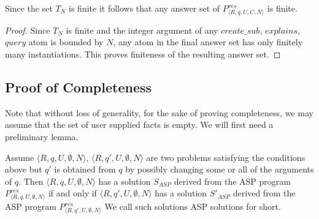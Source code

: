 \begin{lemma}
Since the set $T_{N}$ is finite it follows that any answer set of $P_{\langle
  R,q,U,C,N \rangle}^{res}$ is finite.
\end{lemma}

\begin{proof}
Since $T_{N}$ is finite and the integer argument of any $create\_sub$, $explains$, $query$ 
atom is bounded by $N$, any atom in the final answer set has only finitely
many instantiations. This proves finiteness of the resulting answer set.
\end{proof}

\subsection{Proof of Completeness}\label{sec:proof_completenes}


Note that without loss of generality, for the sake of proving completeness, we may assume that the set of user supplied facts is empty. We will first need a preliminary lemma.

\begin{lemma}
Assume $\langle R,q,U,\emptyset,N\rangle$, $\langle R,q',U,\emptyset,N\rangle$ are two
problems satisfying the conditions above but $q'$ is obtained from $q$ by
possibly changing some or all of the arguments of $q$. Then $\langle
R,q,U,\emptyset,N\rangle$ has a solution $S_{ASP}$ derived from the ASP program $P_{\langle R,q,U,\emptyset,N\rangle}^{res}$ if and only if $\langle R,q',U,\emptyset,N\rangle$ has a solution $S'_{ASP}$ derived from the ASP program $P_{\langle R,q',U,\emptyset,N\rangle}^{res}$ We call such solutions ASP solutions for short.
\end{lemma}

